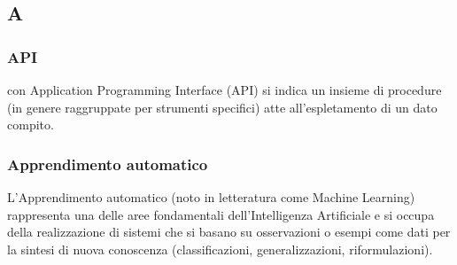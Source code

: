 \subsection*{\textbf{\hfill \Huge{A} \hfill}} 

\subsubsection*{API}
con Application Programming Interface (API) si indica un insieme di procedure (in genere raggruppate per strumenti specifici) atte all'espletamento di un dato compito.

\subsubsection*{Apprendimento automatico}
L'Apprendimento automatico (noto in letteratura come Machine Learning) rappresenta una delle aree fondamentali dell'Intelligenza Artificiale e si occupa della realizzazione di sistemi che si basano su osservazioni o esempi come dati per la sintesi di nuova conoscenza (classificazioni, generalizzazioni, riformulazioni).


